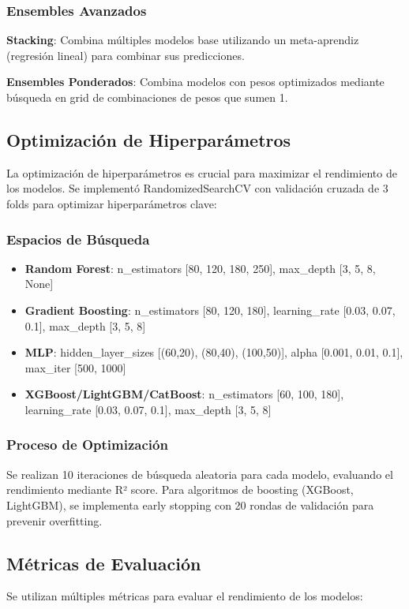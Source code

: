 \documentclass[conference]{IEEEtran}
\begin{document}
	\subsubsection{Ensembles Avanzados}
	\textbf{Stacking}: Combina múltiples modelos base utilizando un meta-aprendiz (regresión lineal) para combinar sus predicciones.
	
	\textbf{Ensembles Ponderados}: Combina modelos con pesos optimizados mediante búsqueda en grid de combinaciones de pesos que sumen 1.
	
	\subsection{Optimización de Hiperparámetros}
	La optimización de hiperparámetros es crucial para maximizar el rendimiento de los modelos. Se implementó RandomizedSearchCV con validación cruzada de 3 folds para optimizar hiperparámetros clave:
	
	\subsubsection{Espacios de Búsqueda}
	\begin{itemize}
		\item \textbf{Random Forest}: n\_estimators [80, 120, 180, 250], max\_depth [3, 5, 8, None]
		\item \textbf{Gradient Boosting}: n\_estimators [80, 120, 180], learning\_rate [0.03, 0.07, 0.1], max\_depth [3, 5, 8]
		\item \textbf{MLP}: hidden\_layer\_sizes [(60,20), (80,40), (100,50)], alpha [0.001, 0.01, 0.1], max\_iter [500, 1000]
		\item \textbf{XGBoost/LightGBM/CatBoost}: n\_estimators [60, 100, 180], learning\_rate [0.03, 0.07, 0.1], max\_depth [3, 5, 8]
	\end{itemize}
	
	\subsubsection{Proceso de Optimización}
	Se realizan 10 iteraciones de búsqueda aleatoria para cada modelo, evaluando el rendimiento mediante R² score. Para algoritmos de boosting (XGBoost, LightGBM), se implementa early stopping con 20 rondas de validación para prevenir overfitting.
	
	\subsection{Métricas de Evaluación}
	Se utilizan múltiples métricas para evaluar el rendimiento de los modelos:
	
\end{document}
